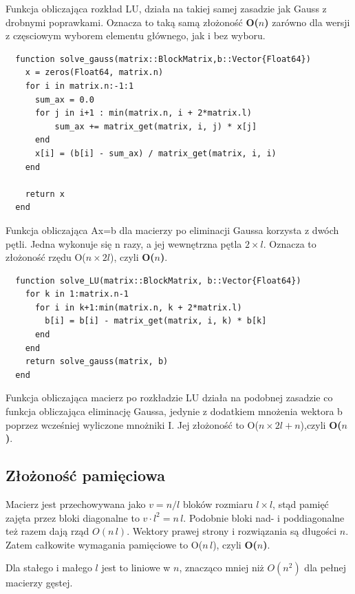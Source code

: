 \documentclass{article}
\begin{document}
Funkcja obliczająca rozkład LU, działa na takiej samej zasadzie jak Gauss z drobnymi poprawkami. Oznacza to taką samą złożoność \textbf{O($n$)} zarówno dla wersji z częsciowym wyborem elementu głównego, jak i bez wyboru.

\begin{shaded}
\begin{verbatim}
  function solve_gauss(matrix::BlockMatrix,b::Vector{Float64})
    x = zeros(Float64, matrix.n)
    for i in matrix.n:-1:1
      sum_ax = 0.0
      for j in i+1 : min(matrix.n, i + 2*matrix.l)
          sum_ax += matrix_get(matrix, i, j) * x[j]
      end
      x[i] = (b[i] - sum_ax) / matrix_get(matrix, i, i)
    end

    return x
  end
\end{verbatim}
\end{shaded}

Funkcja obliczająca Ax=b dla macierzy po eliminacji Gaussa korzysta z dwóch pętli. Jedna wykonuje się n razy, a jej wewnętrzna pętla $2\times l$. Oznacza to złożoność rzędu O($n\times 2l$), czyli \textbf{O($n$)}.

\begin{shaded}
\begin{verbatim}
  function solve_LU(matrix::BlockMatrix, b::Vector{Float64})
    for k in 1:matrix.n-1
      for i in k+1:min(matrix.n, k + 2*matrix.l)
        b[i] = b[i] - matrix_get(matrix, i, k) * b[k]
      end
    end
    return solve_gauss(matrix, b)
  end
\end{verbatim}
\end{shaded}

Funkcja obliczająca macierz po rozkładzie LU działa na podobnej zasadzie co funkcja obliczająca eliminację Gaussa, jedynie z dodatkiem mnożenia wektora b poprzez wcześniej wyliczone mnożniki I. Jej złożoność to O($n\times 2l+n$),czyli \textbf{O($n$)}.

\subsection*{Złożoność pamięciowa}

Macierz jest przechowywana jako $v= n/l$ bloków rozmiaru $l\times l$, stąd pamięć zajęta przez bloki diagonalne to $v\cdot l^{2}=n\,l$. Podobnie bloki nad- i poddiagonalne też razem dają rząd $O(n\,l)$. Wektory prawej strony i rozwiązania są długości $n$. Zatem całkowite wymagania pamięciowe to O($n\,l$), czyli \textbf{O($n$)}.

Dla stałego i małego $l$ jest to liniowe w $n$, znacząco mniej niż $O(n^{2})$ dla pełnej macierzy gęstej.
\end{document}
